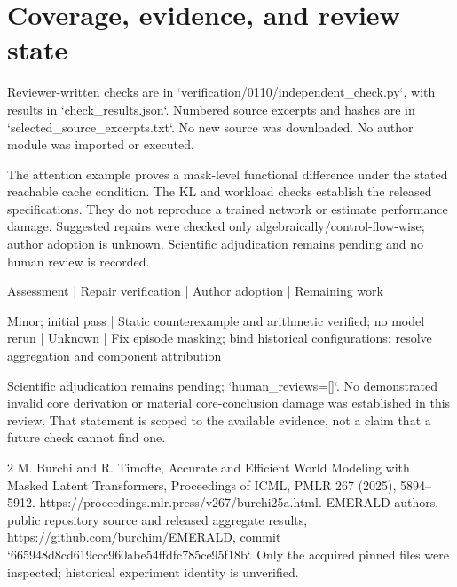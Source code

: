 \documentclass[10pt]{article}
\begin{document}
\section*{Coverage, evidence, and review state}
Reviewer-written checks are in `verification/0110/independent\_check.py`, with results in `check\_results.json`. Numbered source excerpts and hashes are in `selected\_source\_excerpts.txt`. No new source was downloaded. No author module was imported or executed.\par
The attention example proves a mask-level functional difference under the stated reachable cache condition. The KL and workload checks establish the released specifications. They do not reproduce a trained network or estimate performance damage. Suggested repairs were checked only algebraically/control-flow-wise; author adoption is unknown. Scientific adjudication remains pending and no human review is recorded.\par
Assessment | Repair verification | Author adoption | Remaining work\par
Minor; initial pass | Static counterexample and arithmetic verified; no model rerun | Unknown | Fix episode masking; bind historical configurations; resolve aggregation and component attribution\par
Scientific adjudication remains pending; `human\_reviews=[]`. No demonstrated invalid core derivation or material core-conclusion damage was established in this review. That statement is scoped to the available evidence, not a claim that a future check cannot find one.\par
2 M. Burchi and R. Timofte, Accurate and Efficient World Modeling with Masked Latent Transformers, Proceedings of ICML, PMLR 267 (2025), 5894–5912. https://proceedings.mlr.press/v267/burchi25a.html. EMERALD authors, public repository source and released aggregate results, https://github.com/burchim/EMERALD, commit `665948d8cd619ccc960abe54ffdfc785ce95f18b`. Only the acquired pinned files were inspected; historical experiment identity is unverified.\par
\end{document}
